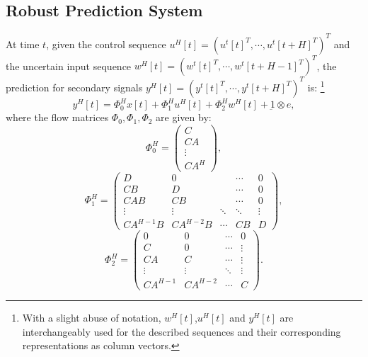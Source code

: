 \documentclass[letterpaper, 10 pt, conference]{ieeeconf}
\begin{document}
\subsection{Robust Prediction System}


At time $t$, given the control sequence $u^H[t]=(u^t[t]^T,\cdots,u^t[t+H]^T)^T$ and the uncertain input sequence $w^H[t]=(w^t[t]^T,\cdots,w^t[t+H-1]^T)^T$, the prediction for secondary signals $y^H[t]=(y^t[t]^T, \cdots,y^t[t+H]^T )^T$ is:
\footnote{With a slight abuse of notation, $w^H[t]$,$u^H[t]$ and $y^H[t]$ are interchangeably used for the described sequences and their corresponding representations as column vectors.}
\begin{equation}
\label{eq:matrix}
y^H[t]
=
\Phi_0^H x[t]
+
\Phi_1^H u^H[t]
+ 
\Phi_2^H w^H[t]
+
\underbar{1} \otimes e,
\end{equation}
where the flow matrices $\Phi_0,\Phi_1,\Phi_2$ are given by:
\begin{equation*}
\label{eq:phi}
\Phi_0^H=
\left(
\begin{array}{c}
C \\ CA \\ \vdots \\ CA^H
\end{array}
\right ),
\end{equation*}
\begin{equation*}
\Phi_1^H
=
\left(
\begin{array}{ccccc}
D & 0 && \cdots & 0 \\
CB & D && \cdots & 0 \\
CAB & CB && \cdots &0 \\
\vdots & \vdots &  \ddots &\ddots& \vdots \\
CA^{H-1}B & CA^{H-2}B & \cdots & CB & D 
\end{array}
\right),
\end{equation*}
\begin{equation*}
\Phi_2^H= 
\left(
\begin{array}{cccc}
0 & 0 & \cdots & 0 \\
C & 0 & \cdots & \vdots \\
CA & C & \cdots &\vdots \\
\vdots & \vdots &  \ddots & \vdots \\
CA^{H-1} & CA^{H-2} & \cdots & C 
\end{array}
\right).
\end{equation*}
\end{document}
